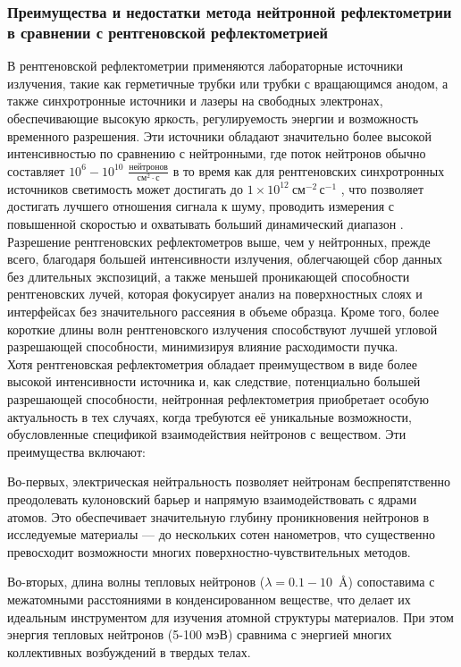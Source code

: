 \documentclass[a4paper]{article}
\begin{document}
\subsubsection{Преимущества и недостатки метода нейтронной рефлектометрии в сравнении с рентгеновской рефлектометрией}
В рентгеновской рефлектометрии применяются лабораторные источники излучения, такие как герметичные трубки или трубки с вращающимся анодом, а также синхротронные источники и лазеры на свободных электронах, обеспечивающие высокую яркость, регулируемость энергии и возможность временного разрешения. Эти источники обладают значительно более высокой интенсивностью по сравнению с нейтронными, где поток нейтронов обычно составляет 
    $10^6 - 10^{10}$  \( \frac{\text{нейтронов}}{\text{см}^2 \cdot \text{с}} \)
 в то время как для рентгеновских синхротронных источников светимость может достигать до $1\times10^{12}~\text{см}^{-2}\,\text{с}^{-1}$
 , что позволяет достигать лучшего отношения сигнала к шуму, проводить измерения с повышенной скоростью и охватывать больший динамический диапазон  \cite{11}. Разрешение рентгеновских рефлектометров выше, чем у нейтронных, прежде всего, благодаря большей интенсивности излучения, облегчающей сбор данных без длительных экспозиций, а также меньшей проникающей способности рентгеновских лучей, которая фокусирует анализ на поверхностных слоях и интерфейсах без значительного рассеяния в объеме образца. Кроме того, более короткие длины волн рентгеновского излучения способствуют лучшей угловой разрешающей способности, минимизируя влияние расходимости пучка.\\
Хотя рентгеновская рефлектометрия обладает преимуществом в виде более высокой интенсивности источника и, как следствие, потенциально большей разрешающей способности, нейтронная рефлектометрия приобретает особую актуальность в тех случаях, когда требуются её уникальные возможности, обусловленные спецификой взаимодействия нейтронов с веществом. Эти преимущества включают:

Во-первых, электрическая нейтральность позволяет нейтронам беспрепятственно преодолевать кулоновский барьер и напрямую взаимодействовать с ядрами атомов. Это обеспечивает значительную глубину проникновения нейтронов в исследуемые материалы — до нескольких сотен нанометров, что существенно превосходит возможности многих поверхностно-чувствительных методов. 

Во-вторых, длина волны тепловых нейтронов ($\lambda = 0.1-10 $~Å)   сопоставима с межатомными расстояниями в конденсированном веществе, что делает их идеальным инструментом для изучения атомной структуры материалов. При этом энергия тепловых нейтронов (5-100 мэВ) сравнима с энергией многих коллективных возбуждений в твердых телах. 
\end{document}
